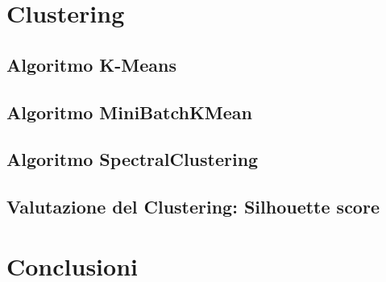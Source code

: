 \documentclass[12pt,oneside]{article}
\begin{document}
\section{Clustering}
    \begin{enumerate}
    \subsection{Algoritmo K-Means}
    \end{enumerate}

    \begin{enumerate}
    \subsection{Algoritmo MiniBatchKMean}
    \end{enumerate}

    \begin{enumerate}
    \subsection{Algoritmo SpectralClustering}
    \end{enumerate}

    \begin{enumerate}
    \subsection{Valutazione del Clustering: Silhouette score}
    \end{enumerate}

\section{Conclusioni}

    
\end{document}
